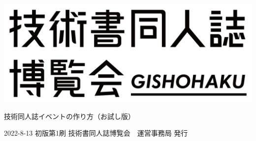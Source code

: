 \clearpage{\thispagestyle{empty}}
\begin{center}

\includegraphics[width=0.75\linewidth]{images/chap-title/logo.png}
\vspace{80pt}

\begin{sffamily}
\Large
技術同人誌イベントの作り方（お試し版）
\normalsize
\end{sffamily}
\vspace{320pt}

\begin{sffamily}
2022-8-13
\hspace{5pt}
初版第1刷
\hspace{5pt}
技術書同人誌博覧会　運営事務局
\hspace{5pt}
発行
\end{sffamily}

\end{center}
